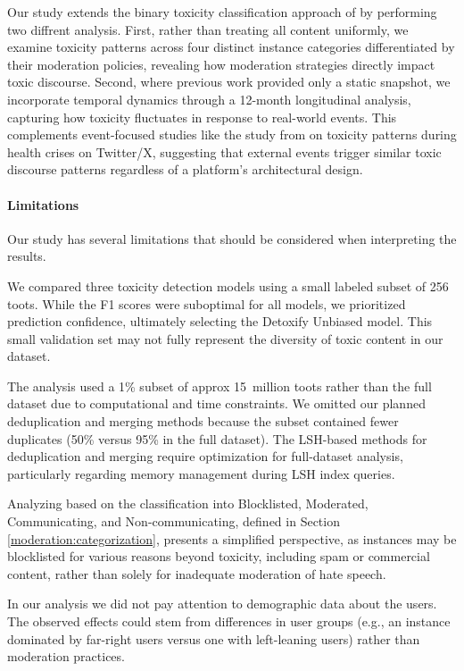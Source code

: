 Our study extends the binary toxicity classification approach of \citet{al-khateeb:2022} by performing two diffrent analysis. First, rather than treating all content uniformly, we examine toxicity patterns across four distinct instance categories differentiated by their moderation policies, revealing how moderation strategies directly impact toxic discourse. Second, where previous work provided only a static snapshot, we incorporate temporal dynamics through a 12-month longitudinal analysis, capturing how toxicity fluctuates in response to real-world events. This complements event-focused studies like the study from \citet{fan:2022} on toxicity patterns during health crises on Twitter/X, suggesting that external events trigger similar toxic discourse patterns regardless of a platform's architectural design.

\paragraph{Limitations}
Our study has several limitations that should be considered when interpreting the results.

We compared three toxicity detection models using a small labeled subset of 256 toots. While the F1 scores were suboptimal for all models, we prioritized prediction confidence, ultimately selecting the Detoxify Unbiased model. This small validation set may not fully represent the diversity of toxic content in our dataset.

The analysis used a 1\% subset of approx 15~million toots rather than the full dataset due to computational and time constraints. We omitted our planned deduplication and merging methods because the subset contained fewer duplicates (50\% versus 95\% in the full dataset). The LSH-based methods for deduplication and merging require optimization for full-dataset analysis, particularly regarding memory management during LSH index queries.

Analyzing based on the classification into Blocklisted, Moderated, Communicating, and Non-communicating, defined in Section \ref{moderation:categorization}, presents a simplified perspective, as instances may be blocklisted for various reasons beyond toxicity, including spam or commercial content, rather than solely for inadequate moderation of hate speech.

In our analysis we did not pay attention to demographic data about the users. The observed effects could stem from differences in user groups (e.g., an instance dominated by far-right users versus one with left-leaning users) rather than moderation practices.

